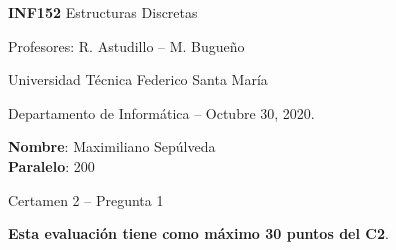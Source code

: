 \documentclass[letterpaper,10pt]{article}
\begin{document}
\thispagestyle{empty}

\begin{minipage}[t]{0.6\textwidth}

{\LARGE \textbf{INF152} Estructuras Discretas}

{\large Profesores: R. Astudillo -- M. Bugueño}

Universidad Técnica Federico Santa María

Departamento de Informática -- Octubre 30, 2020.

\end{minipage}
\hfill
\begin{minipage}[t]{0.35\textwidth}
\textbf{Nombre}: Maximiliano Sepúlveda \\[0.3cm]
  \textbf{Paralelo}: 200
\end{minipage}

\vspace{0.8cm}

{\Large Certamen 2 -- Pregunta 1}

\vspace{0.4cm}

\textbf{Esta evaluación tiene como máximo 30 puntos del C2}.
\end{document}
